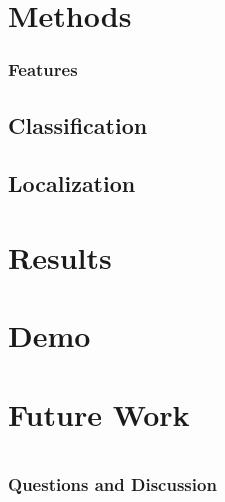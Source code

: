 \documentclass{beamer}
\newcommand{\slide}[2]
{
\begin{frame}
\frametitle{#1} 

#2

\end{frame}
}
\begin{document}
\section{Methods}
\slide{Features}
{
	
}


\subsection{Classification}

\subsection{Localization}

\section{Results}

\section{Demo}

\section{Future Work}

\section{}

\slide{Questions and Discussion}
{}
\end{document}
